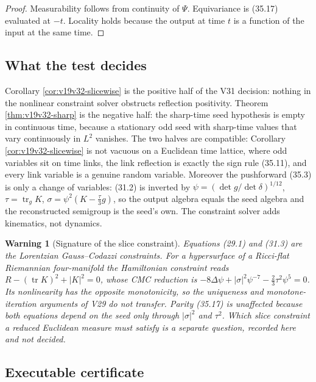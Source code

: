 \documentclass[11pt]{article}
\newtheorem{warning}[theorem]{Warning}
\theoremstyle{remark}
\begin{document}
\begin{proof}
Measurability follows from continuity of \(\Psi\).  Equivariance is
(35.17) evaluated at \(-t\).  Locality holds because the output at time
\(t\) is a function of the input at the same time.
\end{proof}

\subsection{What the test decides}

Corollary \ref{cor:v19v32-slicewise} is the positive half of the V31
decision: nothing in the nonlinear constraint solver obstructs
reflection positivity.  Theorem \ref{thm:v19v32-sharp} is the negative
half: the sharp-time seed hypothesis is empty in continuous time, because
a stationary odd seed with sharp-time values that vary continuously in
\(L^2\) vanishes.  The two halves are compatible: Corollary
\ref{cor:v19v32-slicewise} is not vacuous on a Euclidean time lattice,
where odd variables sit on time links, the link reflection is exactly
the sign rule (35.11), and every link variable is a genuine random
variable.  Moreover the pushforward (35.3) is only a change of variables:
(31.2) is inverted by
\(\psi=(\det g/\det\delta)^{1/12}\), \(\tau=\operatorname{tr}_gK\),
\(\sigma=\psi^2(K-\tfrac\tau3g)\), so the output algebra equals the seed
algebra and the reconstructed semigroup is the seed's own.  The
constraint solver adds kinematics, not dynamics.

\begin{warning}[Signature of the slice constraint]
\label{warn:v19v32-signature}
Equations (29.1) and (31.3) are the Lorentzian Gauss--Codazzi
constraints.  For a hypersurface of a Ricci-flat Riemannian
four-manifold the Hamiltonian constraint reads
\(R-(\operatorname{tr}K)^2+|K|^2=0\), whose CMC reduction is
\(-8\Delta\psi+|\sigma|^2\psi^{-7}-\tfrac23\tau^2\psi^5=0\).  Its
nonlinearity has the opposite monotonicity, so the uniqueness and
monotone-iteration arguments of V29 do not transfer.  Parity (35.17) is
unaffected because both equations depend on the seed only through
\(|\sigma|^2\) and \(\tau^2\).  Which slice constraint a reduced
Euclidean measure must satisfy is a separate question, recorded here and
not decided.
\end{warning}

\subsection{Executable certificate}
\end{document}

